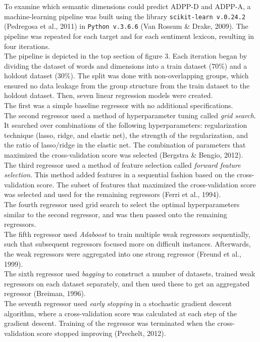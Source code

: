 \documentclass[11pt, a4paper]{article}
\begin{document}
To examine which semantic dimensions could predict ADPP-D and ADPP-A, a machine-learning pipeline was built using the library \texttt{scikit-learn v.0.24.2} (Pedregosa et al., 2011) in \texttt{Python v.3.6.6} (Van Rossum \& Drake, 2009). The pipeline was repeated for each target and for each sentiment lexicon, resulting in four iterations.\\ 
The pipeline is depicted in the top section of figure 3. Each iteration began by dividing the dataset of words and dimensions into a train dataset (70\%) and a holdout dataset (30\%). The split was done with non-overlapping groups, which ensured no data leakage from the group structure from the train dataset to the holdout dataset. Then, seven linear regression models were created.\\
The first was a simple baseline regressor with no additional specifications.\\
The second regressor used a method of hyperparameter tuning called \textit{grid search}. It searched over combinations of the following hyperparameters: regularization technique (lasso, ridge, and elastic net), the strength of the regularization, and the ratio of lasso/ridge in the elastic net. The combination of parameters that maximized the cross-validation score was selected (Bergstra \& Bengio, 2012).\\
The third regressor used a method of feature selection called \textit{forward feature selection}. This method added features in a sequential fashion based on the cross-validation score. The subset of features that maximized the cross-validation score was selected and used for the remaining regressors (Ferri et al., 1994). \\
The fourth regressor used grid search to select the optimal hyperparameters similar to the second regressor, and was then passed onto the remaining regressors. \\
The fifth regressor used \textit{Adaboost} to train multiple weak regressors sequentially, such that subsequent regressors focused more on difficult instances. Afterwards, the weak regressors were aggregated into one strong regressor (Freund et al., 1999).\\
The sixth regressor used \textit{bagging} to construct a number of datasets, trained weak regressors on each dataset separately, and then used these to get an aggregated regressor (Breiman, 1996). \\
The seventh regressor used \textit{early stopping} in a stochastic gradient descent algorithm, where a cross-validation score was calculated at each step of the gradient descent. Training of the regressor was terminated when the cross-validation score stopped improving (Prechelt, 2012).
\end{document}
